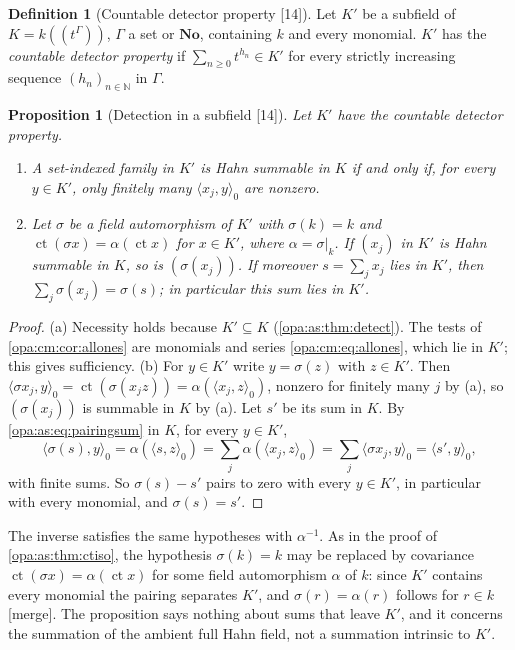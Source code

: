 \documentclass[11pt,oneside]{article}
\numberwithin{equation}{section}
\newtheorem{proposition}[proposition]{Proposition}
\theoremstyle{definition}
\newtheorem{definition}[definition]{Definition}
\theoremstyle{remark}
\newcommand{\No}{\mathbf{No}}
\newcommand{\N}{\mathbb N}
\newcommand{\ct}{\operatorname{ct}}
\newcommand{\Hahn}[2]{#1((t^{#2}))}
\newcommand{\src}[1]{\textup{\textsf{\small[#1]}}}
\newcommand{\mergetag}{\textup{\textsf{\small[merge]}}}
\newcommand{\pairing}[2]{\langle #1,#2\rangle_0}
\begin{document}
\begin{definition}[Countable detector property \src{14}]\label{opa:cm:def:detector}
Let $K'$ be a subfield of $K=\Hahn k\Gamma$, $\Gamma$ a set or $\No$, containing $k$ and every
monomial. $K'$ has the \emph{countable detector property} if $\sum_{n\ge0}t^{h_n}\in K'$ for every
strictly increasing sequence $(h_n)_{n\in\N}$ in $\Gamma$.
\end{definition}

\begin{proposition}[Detection in a subfield \src{14}]\label{opa:cm:prop:workspace}
Let $K'$ have the countable detector property.
\begin{enumerate}[label=\textup{(\alph*)},itemsep=1pt]
\item A set-indexed family in $K'$ is Hahn summable in $K$ if and only if, for every $y\in K'$,
only finitely many $\pairing{x_j}y$ are nonzero.
\item Let $\sigma$ be a field automorphism of $K'$ with $\sigma(k)=k$ and
$\ct(\sigma x)=\alpha(\ct x)$ for $x\in K'$, where $\alpha=\sigma|_k$. If $(x_j)$ in $K'$ is Hahn
summable in $K$, so is $(\sigma(x_j))$. If moreover $s=\sum_jx_j$ lies in $K'$, then
$\sum_j\sigma(x_j)=\sigma(s)$; in particular this sum lies in $K'$.
\end{enumerate}
\end{proposition}
\begin{proof}
(a) Necessity holds because $K'\subseteq K$ (\cref{opa:as:thm:detect}). The tests of
\cref{opa:cm:cor:allones} are monomials and series \eqref{opa:cm:eq:allones}, which lie in $K'$;
this gives sufficiency.
(b) For $y\in K'$ write $y=\sigma(z)$ with $z\in K'$. Then
$\pairing{\sigma x_j}y=\ct(\sigma(x_jz))=\alpha(\pairing{x_j}z)$, nonzero for finitely many $j$ by
(a), so $(\sigma(x_j))$ is summable in $K$ by (a). Let $s'$ be its sum in $K$. By
\eqref{opa:as:eq:pairingsum} in $K$, for every $y\in K'$,
\[
 \pairing{\sigma(s)}y=\alpha(\pairing sz)=\sum_j\alpha(\pairing{x_j}z)=\sum_j\pairing{\sigma x_j}y
 =\pairing{s'}y,
\]
with finite sums. So $\sigma(s)-s'$ pairs to zero with every $y\in K'$, in particular with every
monomial, and $\sigma(s)=s'$.
\end{proof}

The inverse satisfies the same hypotheses with $\alpha^{-1}$. As in the proof of
\cref{opa:as:thm:ctiso}, the hypothesis $\sigma(k)=k$ may be replaced by covariance
$\ct(\sigma x)=\alpha(\ct x)$ for some field automorphism $\alpha$ of $k$: since $K'$ contains
every monomial the pairing separates $K'$, and $\sigma(r)=\alpha(r)$ follows for $r\in k$
\mergetag. The proposition says nothing about sums that leave $K'$, and it concerns the
summation of the ambient full Hahn field, not a summation intrinsic to $K'$.
\end{document}
